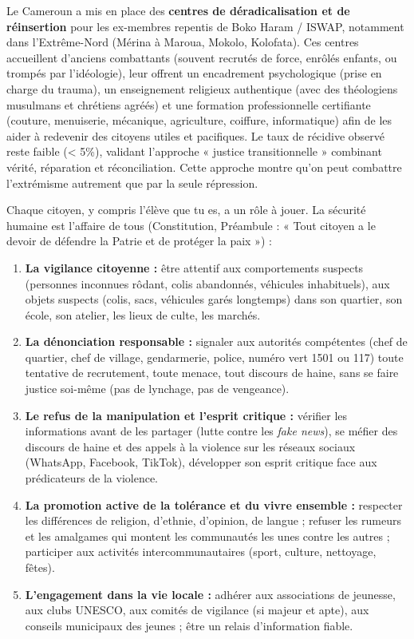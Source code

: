 \documentclass[11pt]{article}
\newcommand{\cle}[1]{{\popxbold\color{popdark}#1}}
\newcounter{popsec}
\newcounter{popsub}
\newcommand{\courssub}[1]{%
  \stepcounter{popsub}%
  \par\vspace{9pt}\noindent{\popxbold\fontsize{11.5}{13}\selectfont\color{popink}{\color{poporange}\thepopsec.\thepopsub}\hspace{6pt}#1}\par\nopagebreak\vspace{4pt}
}
\begin{document}
\begin{savaistu}
Le Cameroun a mis en place des \textbf{centres de déradicalisation et de réinsertion} pour les ex-membres repentis de Boko Haram / ISWAP, notamment dans l'Extrême-Nord (Mérina à Maroua, Mokolo, Kolofata). Ces centres accueillent d'anciens combattants (souvent recrutés de force, enrôlés enfants, ou trompés par l'idéologie), leur offrent un encadrement psychologique (prise en charge du trauma), un enseignement religieux authentique (avec des théologiens musulmans et chrétiens agréés) et une formation professionnelle certifiante (couture, menuiserie, mécanique, agriculture, coiffure, informatique) afin de les aider à redevenir des citoyens utiles et pacifiques. Le taux de récidive observé reste faible (< 5\%), validant l'approche « justice transitionnelle » combinant vérité, réparation et réconciliation. Cette approche montre qu'on peut combattre l'extrémisme autrement que par la seule répression.
\end{savaistu}

\courssub{Le rôle du citoyen dans la lutte contre l'extrémisme}

Chaque citoyen, y compris l'élève que tu es, a un rôle à jouer. La \cle{sécurité humaine} est l'affaire de tous (Constitution, Préambule : « Tout citoyen a le devoir de défendre la Patrie et de protéger la paix ») :

\begin{enumerate}
\item \textbf{La vigilance citoyenne :} être attentif aux comportements suspects (personnes inconnues rôdant, colis abandonnés, véhicules inhabituels), aux objets suspects (colis, sacs, véhicules garés longtemps) dans son quartier, son école, son atelier, les lieux de culte, les marchés.
\item \textbf{La dénonciation responsable :} signaler aux autorités compétentes (chef de quartier, chef de village, gendarmerie, police, numéro vert 1501 ou 117) toute tentative de recrutement, toute menace, tout discours de haine, sans se faire justice soi-même (pas de lynchage, pas de vengeance).
\item \textbf{Le refus de la manipulation et l'esprit critique :} vérifier les informations avant de les partager (lutte contre les \emph{fake news}), se méfier des discours de haine et des appels à la violence sur les réseaux sociaux (WhatsApp, Facebook, TikTok), développer son esprit critique face aux prédicateurs de la violence.
\item \textbf{La promotion active de la tolérance et du vivre ensemble :} respecter les différences de religion, d'ethnie, d'opinion, de langue ; refuser les rumeurs et les amalgames qui montent les communautés les unes contre les autres ; participer aux activités intercommunautaires (sport, culture, nettoyage, fêtes).
\item \textbf{L'engagement dans la vie locale :} adhérer aux associations de jeunesse, aux clubs UNESCO, aux comités de vigilance (si majeur et apte), aux conseils municipaux des jeunes ; être un relais d'information fiable.
\end{enumerate}
\end{document}
